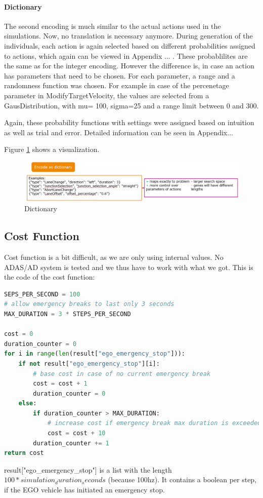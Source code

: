\paragraph{Dictionary}
The second encoding is much similar to the actual actions used in the simulations. Now, no translation is necessary anymore. During generation of the individuals, each action is again selected based on different probabilities assigned to actions, which again can be viewed in Appendix ... . These probablilites are the same as for the integer encoding. However the difference is, in case an action has parameters that need to be chosen. 
For each parameter, a range and a randomness function was chosen. For example in case of the percenetage parameter in ModifyTargetVelocity, the values are selected from a GausDistribution, with mu= 100, sigma=25 and a range limit between 0 and 300.

Again, these probability functions with settings were assigned based on intuition as well as trial and error. Detailed information can be seen in Appendix...

Figure \ref{figure:encoding:gene:dict} shows a visualization.

\begin{figure}[ht] 
	\includegraphics[width=1\linewidth]{figures/dict_encoding}
	\caption{Dictionary}
	\label{figure:encoding:gene:dict}
\end{figure}

\subsection{Cost Function}

Cost function is a bit difficult, as we are only using internal values. No ADAS/AD system is tested and we thus have to work with what we got.
This is the code of the cost function:

\begin{lstlisting}[language=Python, tabsize=4]
SEPS_PER_SECOND = 100
# allow emergency breaks to last only 3 seconds
MAX_DURATION = 3 * STEPS_PER_SECOND

cost = 0
duration_counter = 0
for i in range(len(result["ego_emergency_stop"])):
	if not result["ego_emergency_stop"][i]:
		# base cost in case of no current emergency break
		cost = cost + 1
		duration_counter = 0
	else:
		if duration_counter > MAX_DURATION:
			# increase cost if emergency break max duration is exceeded
			cost = cost + 10
		duration_counter += 1
return cost
\end{lstlisting}
result["ego\_emergency\_stop"] is a list with the length $100 * simulation_duration_seconds$ (because 100hz). It contains a boolean per step, if the EGO vehicle has initiated an emergency stop.

